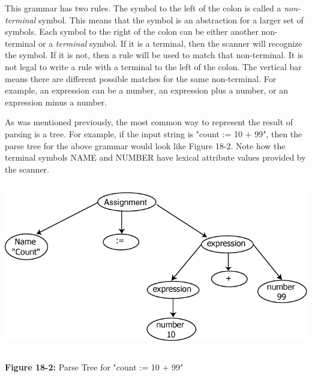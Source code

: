 
This grammar has two rules. The symbol to the left of the colon is
called a \textit{non-terminal} symbol. This means that the symbol is an
abstraction for a larger set of symbols. Each symbol to the right of
the colon can be either another non-terminal or a \textit{terminal}
symbol. If it is a terminal, then the scanner will recognize the
symbol. If it is not, then a rule will be used to match that
non-terminal. It is not legal to write a rule with a terminal to the
left of the colon. The vertical bar means there are different possible
matches for the same non-terminal. For example, an expression can be a
number, an expression plus a number, or an expression minus a number.

As was mentioned previously, the most common way to represent the result
of parsing is a tree. For example, if the input string is
\textsf{"count := 10 + 99"}, then the parse
tree for the above grammar would look like Figure 18-2. Note how the
terminal symbols NAME and NUMBER have lexical attribute values provided
by the scanner.


\bigskip

\begin{center}
\includegraphics[width=5.8752in,height=2.8929in]{ub-img/ub-img65.png}
\end{center}

{\sffamily\bfseries Figure 18-2:}
{\sffamily Parse Tree for "count := 10 + 99"}

\bigskip

